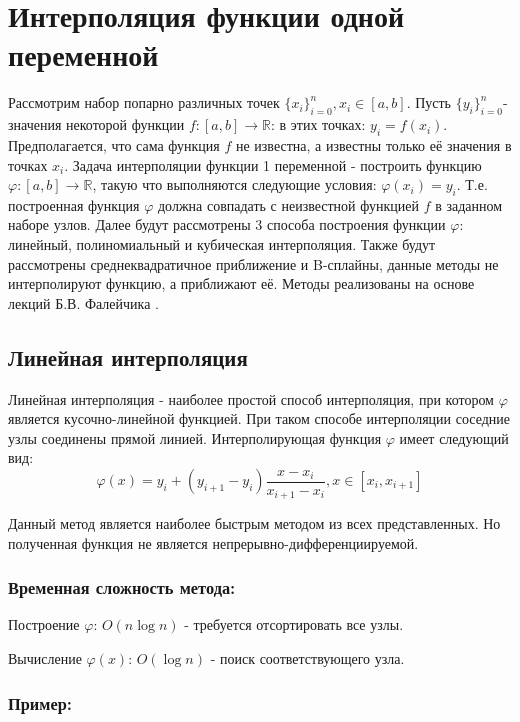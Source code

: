 \section{Интерполяция функции одной переменной}

Рассмотрим набор попарно различных точек $\{x_i\}_{i=0}^n, x_i \in [a, b]$. Пусть $\{y_i\}_{i=0}^n$- значения некоторой функции $f \colon [a,b] \to \mathbb{R}$: в этих точках: $y_i = f(x_i)$. Предполагается, что сама функция $f$ не известна, а известны только её значения в точках $x_i$. Задача интерполяции функции 1 переменной - построить функцию $\varphi \colon [a, b] \to \mathbb{R}$, такую что выполняются следующие условия: $\varphi(x_i) = y_i$. Т.е. построенная функция $\varphi$ должна совпадать с неизвестной функцией $f$ в заданном наборе узлов. Далее будут рассмотрены 3 способа построения функции $\varphi$: линейный, полиномиальный и кубическая интерполяция. Также будут рассмотрены среднеквадратичное приближение и B-сплайны, данные методы не интерполируют функцию, а приближают её. Методы реализованы на основе лекций Б.В. Фалейчика \cite{faleichik2010} \cite{faleichik2012}.

\subsection{Линейная интерполяция}

Линейная интерполяция - наиболее простой способ интерполяция, при котором $\varphi$ является кусочно-линейной функцией. При таком способе интерполяции соседние узлы соединены прямой линией. Интерполирующая функция $\varphi$ имеет следующий вид:
\begin{equation}
  \varphi(x) = y_i + (y_{i+1} - y_i) \frac{x-x_i}{x_{i+1} - x_i}, x\in [x_i, x_{i+1}]
\end{equation}

Данный метод является наиболее быстрым методом из всех представленных. Но полученная функция не является непрерывно-дифференциируемой.

\subsubsection{Временная сложность метода:}

Построение $\varphi$: $ O(n \log n)$ - требуется отсортировать все узлы.

Вычисление $\varphi(x)$: $O(\log n)$ - поиск соответствующего узла.

\subsubsection{Пример:}

